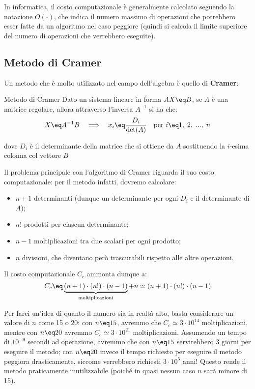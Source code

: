In informatica, il costo computazionale è generalmente calcolato seguendo la notazione $O(\cdot)$, che indica il numero massimo di operazioni che potrebbero esser fatte da un algoritmo nel caso peggiore (quindi si calcola il limite superiore del numero di operazioni che verrebbero eseguite).

\subsection{Metodo di Cramer}

Un metodo che è molto utilizzato nel campo dell'algebra è quello di \textbf{Cramer}:

\begin{definition}{Metodo di Cramer}
    Dato un sistema lineare in forma $AX \eq B$, se $A$ è una matrice regolare, allora attraverso l'inversa $A^{-1}$ si ha che:
    \[ X \eq A^{-1} B \quad \Longrightarrow \quad x_i \eq \frac{D_i}{\text{det}(A)} \quad \text{per } i \eq 1, \; 2, \; ..., \; n \]

    dove $D_i$ è il determinante della matrice che si ottiene da $A$ sostituendo la $i$-esima colonna col vettore $B$
\end{definition}


Il problema principale con l'algoritmo di Cramer riguarda il suo costo computazionale: per il metodo infatti, dovremo calcolare:
\begin{itemize}
    \item $n + 1$ determinanti (dunque un determinante per ogni $D_i$ e il determinante di $A$);
    \item $n!$ prodotti per ciascun determinante;
    \item $n - 1$ moltiplicazioni tra due scalari per ogni prodotto;
    \item $n$ divisioni, che diventano però trascurabili rispetto alle altre operazioni.
\end{itemize}

Il costo computazionale $C_c$ ammonta dunque a:
\[ C_c \eq \underbrace{(n + 1) \cdot (n!) \cdot (n - 1)}_{\text{moltiplicazioni}} + n \simeq (n + 1) \cdot (n!) \cdot (n - 1) \]

Per farci un'idea di quanto il numero sia in realtà alto, basta considerare un valore di $n$ come 15 o 20: con $n \eq 15$, avremmo che $C_c \simeq 3 \cdot 10^{14}$ moltiplicazioni, mentre con $n \eq 20$ avremmo $C_c \simeq 3 \cdot 10^{21}$ moltiplicazioni. Assumendo un tempo di $10^{-9}$ secondi ad operazione, avremmo che con $n \eq 15$ servirebbero 3 giorni per eseguire il metodo; con $n \eq 20$ invece il tempo richiesto per eseguire il metodo peggiora drasticamente, siccome verrebbero richiesti $3 \cdot 10^5$ anni! Questo rende il metodo praticamente inutilizzabile (poiché in quasi nessun caso $n$ sarà minore di 15).

